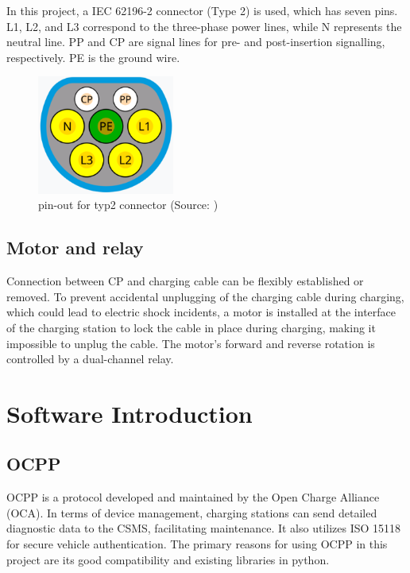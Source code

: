 \documentclass[
english,
ruledheaders=section,%
class=report,%
thesis={type=Report},%
accentcolor=9c,%
custommargins=true,%
marginpar=false,%
parskip=half-,%
fontsize=11pt,%
logofile={img/tuda_logo.pdf}, %
]{tudapub}
\begin{document}
    In this project, a IEC 62196-2 connector (Type 2) is used, which has seven pins. L1, L2, and L3 correspond to the three-phase power lines, while N represents the neutral line. PP and CP are signal lines for pre- and post-insertion signalling, respectively. PE is the ground wire.

    \begin{figure}[H]
        \centering
        \includegraphics[width=0.4\textwidth]{img/pin-out_for_typ2.jpg} %
        \caption{pin-out for typ2 connector
            (Source: \cite{typ2connector})}
        \label{fig:typ2pin-out}
    \end{figure}


    \section{Motor and relay}

    Connection between CP and charging cable can be flexibly established or removed. To prevent accidental unplugging of the charging cable during charging, which could lead to electric shock incidents, a motor is installed at the interface of the charging station to lock the cable in place during charging, making it impossible to unplug the cable. The motor's forward and reverse rotation is controlled by a dual-channel relay.


    \newpage
    \chapter{Software Introduction}

    \section{OCPP}
    \label{sec:ocppIntroduction}

    OCPP is a protocol developed and maintained by the Open Charge Alliance (OCA). In terms of device management, charging stations can send detailed diagnostic data to the CSMS, facilitating maintenance. It also utilizes ISO 15118 for secure vehicle authentication. \cite{OCPP}The primary reasons for using OCPP in this project are its good compatibility and existing libraries in python.
\end{document}
